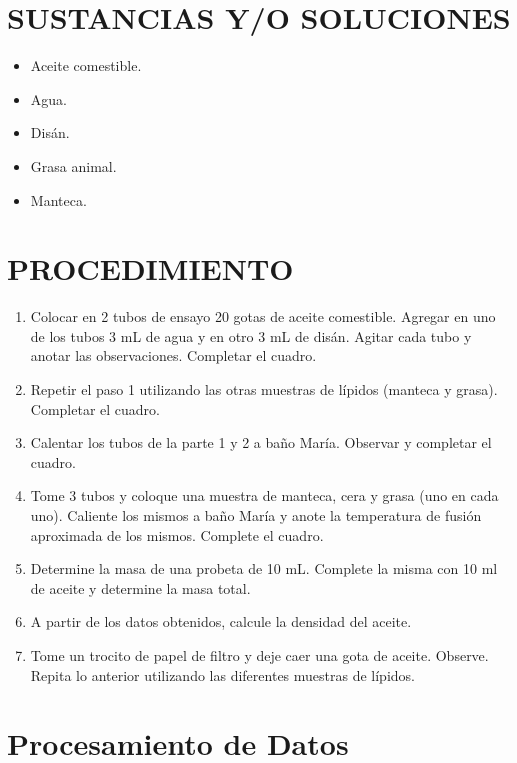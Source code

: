 \documentclass{article}
\begin{document}
\section{SUSTANCIAS Y/O SOLUCIONES}
\begin{itemize}
    \item Aceite comestible.
    \item Agua.
    \item Disán.
    \item Grasa animal.
    \item Manteca.
\end{itemize}


\section{PROCEDIMIENTO}
\begin{enumerate}
    \item Colocar en 2 tubos de ensayo 20 gotas de aceite comestible. Agregar en uno de los tubos 3 mL de agua y en otro 3 mL de disán. Agitar cada tubo y anotar las observaciones. Completar el cuadro.
    \item Repetir el paso 1 utilizando las otras muestras de lípidos (manteca y grasa). Completar el cuadro.
    \item Calentar los tubos de la parte 1 y 2 a baño María. Observar y completar el cuadro.
    \item Tome 3 tubos y coloque una muestra de manteca, cera y grasa (uno en cada uno). Caliente los mismos a baño María y anote la temperatura de fusión aproximada de los mismos. Complete el cuadro.
    \item Determine la masa de una probeta de 10 mL. Complete la misma con 10 ml de aceite y determine la masa total.
    \item A partir de los datos obtenidos, calcule la densidad del aceite.
    \item Tome un trocito de papel de filtro y deje caer una gota de aceite. Observe. Repita lo anterior utilizando las diferentes muestras de lípidos.
\end{enumerate}

\section{Procesamiento de Datos}
\end{document}
